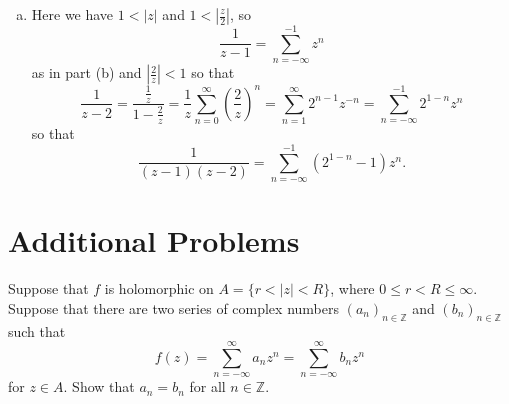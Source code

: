 \documentclass{article}
\newcounter{Problem}
\newenvironment{Problem}{\begin{Exercise}[name={Problem},
                                          counter={Problem}]}
                        {\end{Exercise}}
\begin{document}
\begin{enumerate}[(a)]
{\begin{align*}
          \sum_{n=0}^\infty
            \frac{1}{2^{n+1}}
            z^n
        + \sum_{n=-\infty}^{-1}
            z^n
        \right]
    \end{align*}
    on $1 < |z| < 2$.
  }
  \item{
    Here we have $1 < |z|$ and $1 < \left|\frac{z}{2}\right|$, so
    $$
      \frac{1}{z - 1} 
    = \sum_{n=-\infty}^{-1} 
        z^{n}
    $$
    as in part (b)
    and $\left|\frac{2}{z}\right| < 1$ so that
    $$
      \frac{1}{z - 2}
    = \frac{\frac{1}{z}}{1 - \frac{2}{z}}
    = \frac{1}{z}
      \sum_{n=0}^\infty
        \left(\frac{2}{z}\right)^n
    = \sum_{n=1}^\infty
        2^{n-1} z^{-n}
    = \sum_{n=-\infty}^{-1}
        2^{1-n} z^n
    $$
    so that
    $$
      \frac{1}{(z-1)(z-2)}
    = \sum_{n=-\infty}^{-1}
        (2^{1-n} - 1) z^n.
    $$
  }
\end{enumerate}

\section{Additional Problems}

\begin{Problem}
Suppose that $f$ is holomorphic on 
$A = \{ r < |z| < R \}$, where $0 \leq r < R \leq \infty$.
Suppose that there are two series of complex numbers 
$(a_n)_{n \in \mathbb{Z}}$ and $(b_n)_{n \in \mathbb{Z}}$ such that
$$
f(z) = \sum_{n=-\infty}^\infty a_n z^n = \sum_{n=-\infty}^\infty b_n z^n
$$
for $z \in A$. Show that $a_n = b_n$ for all $n \in \mathbb{Z}$.
\end{Problem}
\end{document}
